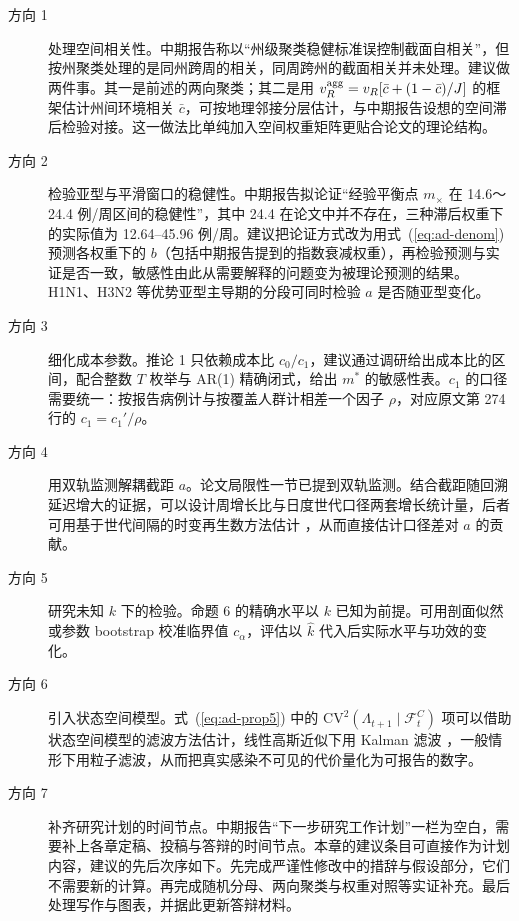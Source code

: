 \begin{description}
\item[方向 1] 处理空间相关性。中期报告称以“州级聚类稳健标准误控制截面自相关”，但按州聚类处理的是同州跨周的相关，同周跨州的截面相关并未处理。建议做两件事。其一是前述的两向聚类；其二是用 $v_R^{\rm agg}=v_R[\bar c+(1-\bar c)/J]$ 的框架估计州间环境相关 $\bar c$，可按地理邻接分层估计，与中期报告设想的空间滞后检验对接。这一做法比单纯加入空间权重矩阵更贴合论文的理论结构。

\item[方向 2] 检验亚型与平滑窗口的稳健性。中期报告拟论证“经验平衡点 $m_\times$ 在 14.6～24.4 例/周区间的稳健性”，其中 24.4 在论文中并不存在，三种滞后权重下的实际值为 12.64--45.96 例/周。建议把论证方式改为用式~(\ref{eq:ad-denom}) 预测各权重下的 $b$（包括中期报告提到的指数衰减权重），再检验预测与实证是否一致，敏感性由此从需要解释的问题变为被理论预测的结果。H1N1、H3N2 等优势亚型主导期的分段可同时检验 $a$ 是否随亚型变化。

\item[方向 3] 细化成本参数。推论 1 只依赖成本比 $c_0/c_1$，建议通过调研给出成本比的区间，配合整数 $T$ 枚举与 AR(1) 精确闭式，给出 $m^*$ 的敏感性表。$c_1$ 的口径需要统一：按报告病例计与按覆盖人群计相差一个因子 $\rho$，对应原文第 274 行的 $c_1=c_1'/\rho$。

\item[方向 4] 用双轨监测解耦截距 $a$。论文局限性一节已提到双轨监测。结合截距随回溯延迟增大的证据，可以设计周增长比与日度世代口径两套增长统计量，后者可用基于世代间隔的时变再生数方法估计 \citep{cori2013new}，从而直接估计口径差对 $a$ 的贡献。

\item[方向 5] 研究未知 $k$ 下的检验。命题 6 的精确水平以 $k$ 已知为前提。可用剖面似然或参数 bootstrap 校准临界值 $c_\alpha$，评估以 $\hat k$ 代入后实际水平与功效的变化。

\item[方向 6] 引入状态空间模型。式~(\ref{eq:ad-prop5}) 中的 $\mathrm{CV}^2(\Lambda_{t+1}\mid\mathcal F_t^C)$ 项可以借助状态空间模型的滤波方法估计，线性高斯近似下用 Kalman 滤波 \citep{hamilton1994time}，一般情形下用粒子滤波，从而把真实感染不可见的代价量化为可报告的数字。

\item[方向 7] 补齐研究计划的时间节点。中期报告“下一步研究工作计划”一栏为空白，需要补上各章定稿、投稿与答辩的时间节点。本章的建议条目可直接作为计划内容，建议的先后次序如下。先完成严谨性修改中的措辞与假设部分，它们不需要新的计算。再完成随机分母、两向聚类与权重对照等实证补充。最后处理写作与图表，并据此更新答辩材料。
\end{description}

